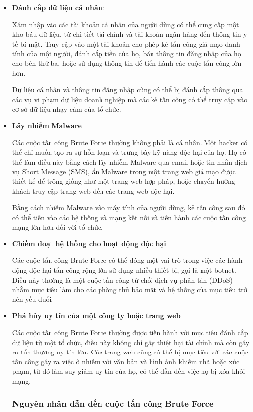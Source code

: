 \begin{itemize}
    



\item \textbf{Đánh cắp dữ liệu cá nhân}:

Xâm nhập vào các tài khoản cá nhân của người dùng có thể cung cấp một kho báu dữ liệu, từ chi tiết tài chính và tài khoản ngân hàng đến thông tin y tế bí mật. Truy cập vào một tài khoản cho phép kẻ tấn công giả mạo danh tính của một người, đánh cắp tiền của họ, bán thông tin đăng nhập của họ cho bên thứ ba, hoặc sử dụng thông tin để tiến hành các cuộc tấn công lớn hơn.

Dữ liệu cá nhân và thông tin đăng nhập cũng có thể bị đánh cắp thông qua các vụ vi phạm dữ liệu doanh nghiệp mà các kẻ tấn công có thể truy cập vào cơ sở dữ liệu nhạy cảm của tổ chức.

\item \textbf{Lây nhiễm Malware}

Các cuộc tấn công Brute Force thường không phải là cá nhân. Một hacker có thể chỉ muốn tạo ra sự hỗn loạn và trưng bày kỹ năng độc hại của họ. Họ có thể làm điều này bằng cách lây nhiễm Malware qua email hoặc tin nhắn dịch vụ Short Message (SMS), ẩn Malware trong một trang web giả mạo được thiết kế để trông giống như một trang web hợp pháp, hoặc chuyển hướng khách truy cập trang web đến các trang web độc hại.

Bằng cách nhiễm Malware vào máy tính của người dùng, kẻ tấn công sau đó có thể tiến vào các hệ thống và mạng kết nối và tiến hành các cuộc tấn công mạng lớn hơn đối với tổ chức.

\item  \textbf{Chiếm đoạt hệ thống cho hoạt động độc hại}

Các cuộc tấn công Brute Force có thể đóng một vai trò trong việc các hành động độc hại tấn công rộng lớn sử dụng nhiều thiết bị, gọi là một botnet. Điều này thường là một cuộc tấn công từ chối dịch vụ phân tán (DDoS) nhằm mục tiêu làm cho các phòng thủ bảo mật và hệ thống của mục tiêu trở nên yếu đuối.

\item \textbf{Phá hủy uy tín của một công ty hoặc trang web}

Các cuộc tấn công Brute Force thường được tiến hành với mục tiêu đánh cắp dữ liệu từ một tổ chức, điều này không chỉ gây thiệt hại tài chính mà còn gây ra tổn thương uy tín lớn. Các trang web cũng có thể bị mục tiêu với các cuộc tấn công gây ra việc ô nhiễm với văn bản và hình ảnh khiếm nhã hoặc xúc phạm, từ đó làm suy giảm uy tín của họ, có thể dẫn đến việc họ bị xóa khỏi mạng.

\subsubsection{ Nguyên nhân dẫn đến cuộc tấn công Brute Force}
\end{itemize}
